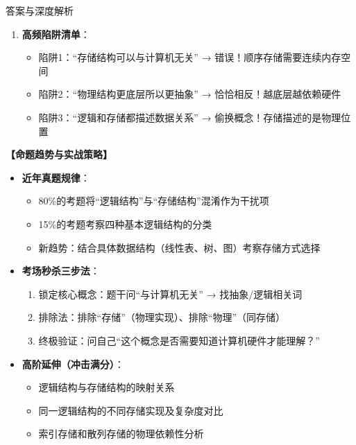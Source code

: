 \documentclass[12pt, a4paper]{article}
\newenvironment{bluebox}{\begin{framed}\begin{minipage}{\textwidth}}{\end{minipage}\end{framed}}
\begin{document}
\begin{bluebox}{答案与深度解析}
\begin{enumerate}
		\item \textbf{高频陷阱清单}：
		      \begin{itemize}
			      \item 陷阱1：“存储结构可以与计算机无关” → 错误！顺序存储需要连续内存空间
			      \item 陷阱2：“物理结构更底层所以更抽象” → 恰恰相反！越底层越依赖硬件
			      \item 陷阱3：“逻辑和存储都描述数据关系” → 偷换概念！存储描述的是物理位置
		      \end{itemize}
	\end{enumerate}

	\textbf{【命题趋势与实战策略】}

	\begin{itemize}
		\item \textbf{近年真题规律}：
		      \begin{itemize}
			      \item 80\%的考题将“逻辑结构”与“存储结构”混淆作为干扰项
			      \item 15\%的考题考察四种基本逻辑结构的分类
			      \item 新趋势：结合具体数据结构（线性表、树、图）考察存储方式选择
		      \end{itemize}

		\item \textbf{考场秒杀三步法}：
		      \begin{enumerate}
			      \item 锁定核心概念：题干问“与计算机无关” → 找抽象/逻辑相关词
			      \item 排除法：排除“存储”（物理实现）、排除“物理”（同存储）
			      \item 终极验证：问自己“这个概念是否需要知道计算机硬件才能理解？”
		      \end{enumerate}

		\item \textbf{高阶延伸（冲击满分）}：
		      \begin{itemize}
			      \item 逻辑结构与存储结构的映射关系
			      \item 同一逻辑结构的不同存储实现及复杂度对比
			      \item 索引存储和散列存储的物理依赖性分析
		      \end{itemize}
	\end{itemize}
\end{bluebox}
\end{document}
